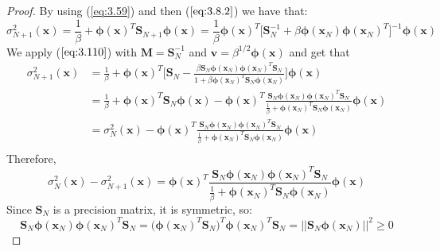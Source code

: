 \begin{proof}
    By using (\ref{eq:3.59}) and then ($\ref{eq:3.8.2}$) we have that:
     \[
         \sigma_{N + 1}^2(\mathbf{x})
         = \frac{1}{\beta} + \bm{\phi}(\mathbf{x})^T\mathbf{S}_{N + 1}\bm{\phi}(\mathbf{x})
         = \frac{1}{\beta} \bm{\phi}(\mathbf{x})^T
         \bigg[\mathbf{S}_N^{-1} + \beta \bm{\phi}(\mathbf{x}_N)\bm{\phi}(\mathbf{x}_N)^T\bigg]^{-1}
                \bm{\phi}(\mathbf{x})
    \] 
    We apply ($\ref{eq:3.110}$) with $\mathbf{M} = \mathbf{S}_N^{-1}$ 
    and $\mathbf{v} = \beta^{1/2}\bm{\phi}(\mathbf{x})$ and get that
    \begin{align*}
        \sigma^{2}_{N + 1}(\mathbf{x})
        &= \frac{1}{\beta} + \bm{\phi}(\mathbf{x})^T
            \bigg[\mathbf{S}_N 
            - \frac{\beta\mathbf{S}_N\bm{\phi}(\mathbf{x}_N)\bm{\phi}(\mathbf{x}_N)^T\mathbf{S}_N}
            {1 + \beta \bm{\phi}(\mathbf{x}_N)^T\mathbf{S}_N\bm{\phi}(\mathbf{x}_N)}\bigg]
        \bm{\phi}(\mathbf{x}) \\
        &= \frac{1}{\beta} + \bm{\phi}(\mathbf{x})^T\mathbf{S}_N\bm{\phi}(\mathbf{x})
            - \bm{\phi}(\mathbf{x})^T\frac{\mathbf{S}_N\bm{\phi}
            (\mathbf{x}_N)\bm{\phi}(\mathbf{x}_N)^T\mathbf{S}_N}
            {\frac{1}{\beta} + \bm{\phi}(\mathbf{x}_N)^T\mathbf{S}_N\bm{\phi}(\mathbf{x}_N)}
            \bm{\phi}(\mathbf{x}) \\
        &= \sigma_{N}^2(\mathbf{x})
            - \bm{\phi}(\mathbf{x})^T
            \frac{\mathbf{S}_N\bm{\phi}(\mathbf{x}_N)\bm{\phi}(\mathbf{x}_N)^T\mathbf{S}_N}
            {\frac{1}{\beta} + \bm{\phi}(\mathbf{x}_N)^T\mathbf{S}_N\bm{\phi}(\mathbf{x}_N)}
            \bm{\phi}(\mathbf{x}) \\
    \end{align*}
    Therefore,
    \begin{equation}\label{eq:3.11.1}\tag{3.11.1}
        \sigma_N^2(\mathbf{x}) - \sigma_{N + 1}^2(\mathbf{x})
        = \bm{\phi}(\mathbf{x})^T
            \frac{\mathbf{S}_N\bm{\phi}(\mathbf{x}_N)\bm{\phi}(\mathbf{x}_N)^T\mathbf{S}_N}
            {\frac{1}{\beta} + \bm{\phi}(\mathbf{x}_N)^T\mathbf{S}_N\bm{\phi}(\mathbf{x}_N)}
            \bm{\phi}(\mathbf{x})
    \end{equation}
    Since $\mathbf{S}_N$ is a precision matrix, it is symmetric, so:
    \[
        \mathbf{S}_N\bm{\phi}(\mathbf{x}_N)\bm{\phi}(\mathbf{x}_N)^T\mathbf{S}_N
        = \big(\bm{\phi}(\mathbf{x}_N)^T\mathbf{S}_N\big)^T\bm{\phi}(\mathbf{x}_N)^T\mathbf{S}_N
        = ||\mathbf{S}_N \bm{\phi}(\mathbf{x}_N)||^2 \geq 0
\]
\end{proof}
